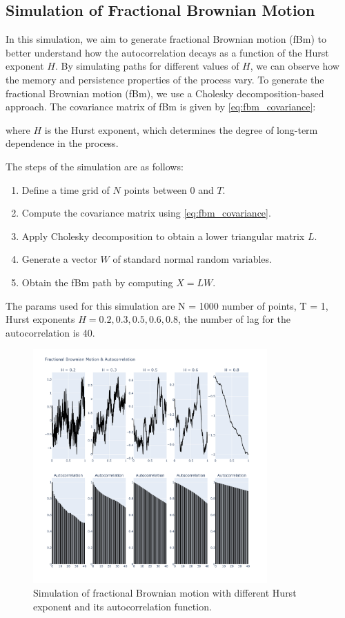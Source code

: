 \documentclass[11pt]{extarticle}
\begin{document}
\subsection{Simulation of Fractional Brownian Motion}

In this simulation, we aim to generate fractional Brownian motion (fBm) to better understand how the autocorrelation
decays as a function of the Hurst exponent \( H \). By simulating paths for different values of \( H \), we can observe
how the memory and persistence properties of the process vary.
To generate the fractional Brownian motion (fBm), we use a Cholesky decomposition-based approach. The covariance matrix of fBm is given by \eqref{eq:fbm_covariance}:

where \( H \) is the Hurst exponent, which determines the degree of long-term dependence in the process.

The steps of the simulation are as follows:
\begin{enumerate}
    \item Define a time grid of \( N \) points between \( 0 \) and \( T \).
    \item Compute the covariance matrix using \eqref{eq:fbm_covariance}.
    \item Apply Cholesky decomposition to obtain a lower triangular matrix \( L \).
    \item Generate a vector \( W \) of standard normal random variables.
    \item Obtain the fBm path by computing \( X = L W \).
\end{enumerate}

The params used for this simulation are N = 1000 number of points, T = 1, Hurst exponents \( H = 0.2, 0.3, 0.5, 0.6, 0.8 \), the number
of lag for the autocorrelation is 40.

\begin{figure}[!ht]
    \centering
    \includegraphics[width=0.8\textwidth]{img/fdm_autocorr}
    \caption{Simulation of fractional Brownian motion with different Hurst exponent and its autocorrelation function.}
    \label{fig:fbm_autocorr}
\end{figure}
\end{document}
